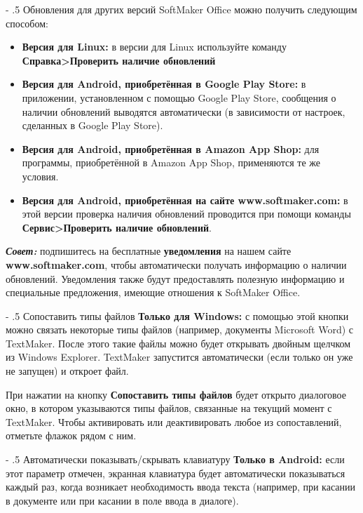 ﻿\documentclass[a4paper,10pt]{article}
\makeatletter
\renewcommand\paragraph{%
   \@startsection{paragraph}{4}{0mm}%
      {-\baselineskip}%
      {.5\baselineskip}%
      {\normalfont\normalsize\bfseries}}
\makeatother
\begin{document}
 \paragraph{Обновления для других версий SoftMaker Office можно получить следующим способом:}
 \begin{itemize}
  \item \textbf{Версия для Linux:} в версии для Linux используйте команду \textbf{Справка>Проверить наличие обновлений}
  \item \textbf{Версия для Android, приобретённая в Google Play Store:} в приложении, установленном с помощью Google Play Store, сообщения о наличии обновлений выводятся автоматически (в зависимости от настроек, сделанных в Google Play Store).
  \item \textbf{Версия для Android, приобретённая в Amazon App Shop:} для программы, приобретённой в Amazon App Shop, применяются те же условия.
  \item \textbf{Версия для Android, приобретённая на сайте www.softmaker.com:} в этой версии проверка наличия обновлений проводится при помощи команды \textbf{Сервис>Проверить наличие обновлений}.
 \end{itemize}

 \begin{mdframed}[backgroundcolor=blue!10]
\textbf{\textit{Совет:}} подпишитесь на бесплатные \textbf{уведомления} на нашем сайте \textbf{www.softmaker.com}, чтобы автоматически получать информацию о наличии обновлений. Уведомления также будут предоставлять полезную информацию и специальные предложения, имеющие отношения к SoftMaker Office.
\end{mdframed}
 
 \paragraph{Сопоставить типы файлов}
 \textbf{Только для Windows:} с помощью этой кнопки можно связать некоторые типы файлов (например, документы Microsoft Word) с TextMaker. После этого такие файлы можно будет открывать двойным щелчком из Windows Explorer. TextMaker запустится автоматически (если только он уже не запущен) и откроет файл.
 
 При нажатии на кнопку \textbf{Сопоставить типы файлов} будет открыто диалоговое окно, в котором указываются типы файлов, связанные на текущий момент с TextMaker. Чтобы активировать или деактивировать любое из сопоставлений, отметьте флажок рядом с ним.
 
 \paragraph{Автоматически показывать/скрывать клавиатуру}
 \textbf{Только в Android:} если этот параметр отмечен, экранная клавиатура будет автоматически показываться каждый раз, когда возникает необходимость ввода текста (например, при касании в документе или при касании в поле ввода в диалоге).
 
\end{document}
